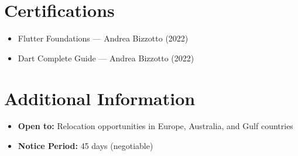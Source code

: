 \documentclass[11pt,a4paper,sans]{moderncv}
\begin{document}
\section{Certifications}
\begin{itemize}
    \item Flutter Foundations — Andrea Bizzotto (2022)
    \item Dart Complete Guide — Andrea Bizzotto (2022)
\end{itemize}

\section{Additional Information}
\begin{itemize}
    \item \textbf{Open to:} Relocation opportunities in Europe, Australia, and Gulf countries
    \item \textbf{Notice Period:} 45 days (negotiable)
\end{itemize}
\end{document}
